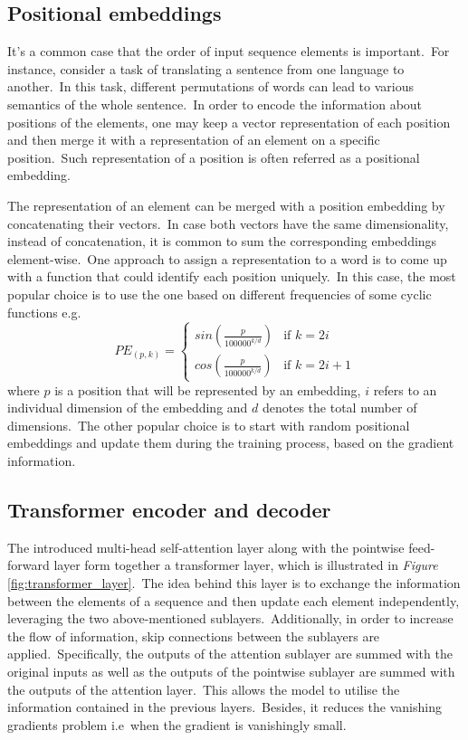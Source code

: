 \documentclass[longabstract, english, mgr]{iithesis}
\theoremstyle{default_theorem_style}\newtheorem{theorem}{Theorem}
\theoremstyle{default_theorem_style}\newtheorem{definition}{Definition}
\begin{document}
\subsection{Positional embeddings}

It's a common case that the order of input sequence elements is important.\ For instance, consider a task of
translating a sentence from one language to another.\ In this task, different permutations of words can lead to
various semantics of the whole sentence.\ In order to encode the information about positions of the elements, one
may keep a vector representation of each position and then merge it with a representation of an element on a
specific position.\ Such representation of a position is often referred as a positional embedding.\newline

\noindent The representation of an element can be merged with a position embedding by concatenating their
vectors.\ In case both vectors have the same dimensionality, instead of concatenation, it is common to sum the
corresponding embeddings element-wise.\ One approach to assign a representation to a word is to come up with a
function that could identify each position uniquely.\ In this case, the most popular choice is to use the one
based on different frequencies of some cyclic functions e.g.
$$
PE_{(p, k)} =
\begin{cases}
sin(\frac{p}{100000^{k / d}}) &\text{if $k = 2i$}\\
cos(\frac{p}{100000^{k / d}}) &\text{if $k = 2i + 1$}
\end{cases}
$$
where $p$ is a position that will be represented by an embedding, $i$ refers to an individual dimension of the
embedding and $d$ denotes the total number of dimensions.\ The other popular choice is to start with random positional
embeddings and update them during the training process, based on the gradient information.

\subsection{Transformer encoder and decoder}\label{subsec:transformer_encoder_decoder}

The introduced multi-head self-attention layer along with the pointwise feed-forward layer form together a
transformer layer, which is illustrated in \textit{Figure} \ref{fig:transformer_layer}.\ The idea behind this layer is
to exchange the information between the elements of a sequence and then update each element independently, leveraging
the two above-mentioned sublayers.\ Additionally, in order to increase the flow of information, skip connections
between the sublayers are applied.\ Specifically, the outputs of the attention sublayer are summed with the original
inputs as well as the outputs of the pointwise sublayer are summed with the outputs of the attention layer.\ This
allows the model to utilise the information contained in the previous layers.\ Besides, it reduces the vanishing
gradients problem i.e\ when the gradient is vanishingly small.\newline
\end{document}
